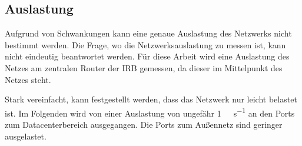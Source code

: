 \subsection{Auslastung}
Aufgrund von Schwankungen kann eine genaue Auslastung des Netzwerks nicht bestimmt werden. Die Frage, wo die Netzwerksauslastung zu messen ist, kann nicht eindeutig beantwortet werden. Für diese Arbeit wird eine Auslastung des Netzes am zentralen Router der IRB gemessen, da dieser im Mittelpunkt des Netzes steht.

Stark vereinfacht, kann festgestellt werden, dass das Netzwerk nur leicht belastet ist. Im Folgenden wird von einer Auslastung von ungefähr \SI{1}{\giga\bit\per\second} an den Ports zum Datacenterbereich ausgegangen. Die Ports zum Außennetz sind geringer ausgelastet.

